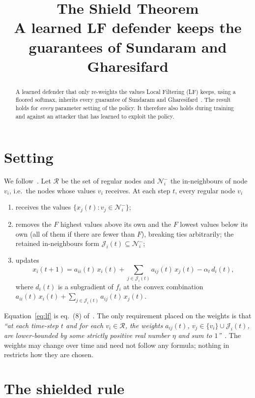 \documentclass[11pt]{article}
\title{The Shield Theorem\\[0.3em]\large A learned LF defender keeps the guarantees of Sundaram and Gharesifard}
\author{}
\date{}
\theoremstyle{definition}
\theoremstyle{remark}
\newcommand{\Nin}{\mathcal{N}_i^{-}}
\newcommand{\J}{\mathcal{J}_i(t)}
\newcommand{\R}{\mathcal{R}}
\begin{document}
\maketitle

\begin{abstract}
A learned defender that only re-weights the values Local Filtering (LF) keeps, using a floored softmax, inherits every guarantee of Sundaram and Gharesifard~\cite{sg2019}. The result holds for \emph{every} parameter setting of the policy. It therefore also holds during training and against an attacker that has learned to exploit the policy.
\end{abstract}

\section{Setting}

We follow~\cite[Sec.~V]{sg2019}. Let $\R$ be the set of regular nodes and $\Nin$ the in-neighbours of node $v_i$, i.e.\ the nodes whose values $v_i$ receives. At each step $t$, every regular node $v_i$
\begin{enumerate}[label=(\roman*)]
  \item receives the values $\{x_j(t) : v_j \in \Nin\}$;
  \item removes the $F$ highest values above its own and the $F$ lowest values below its own (all of them if there are fewer than $F$), breaking ties arbitrarily; the retained in-neighbours form $\J \subseteq \Nin$;
  \item updates
  \begin{equation}\label{eq:lf}
    x_i(t+1) = a_{ii}(t)\,x_i(t) + \sum_{j \in \J} a_{ij}(t)\,x_j(t) - \alpha_t\, d_i(t),
  \end{equation}
  where $d_i(t)$ is a subgradient of $f_i$ at the convex combination $a_{ii}(t)\,x_i(t) + \sum_{j \in \J} a_{ij}(t)\,x_j(t)$.
\end{enumerate}
Equation~\eqref{eq:lf} is eq.~(8) of~\cite{sg2019}. The only requirement placed on the weights is that \emph{``at each time-step $t$ and for each $v_i \in \R$, the weights $a_{ij}(t)$, $v_j \in \{v_i\} \cup \J$, are lower-bounded by some strictly positive real number $\eta$ and sum to $1$''}~\cite[Sec.~V]{sg2019}. The weights may change over time and need not follow any formula; nothing in~\cite{sg2019} restricts how they are chosen.

\section{The shielded rule}
\end{document}
